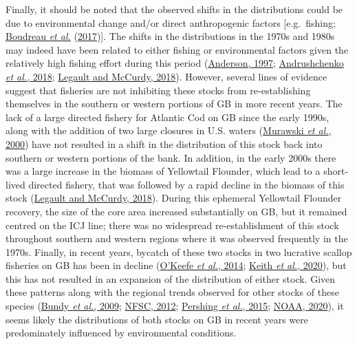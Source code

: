 \documentclass[
]{article}
\begin{document}
Finally, it should be noted that the observed shifts in the distributions could be due to environmental change and/or direct anthropogenic factors {[}e.g.~fishing; \protect\hyperlink{ref-boudreauConnectivityPersistenceLoss2017}{Boudreau \emph{et al.}} (\protect\hyperlink{ref-boudreauConnectivityPersistenceLoss2017}{2017}){]}. The shifts in the distributions in the 1970s and 1980s may indeed have been related to either fishing or environmental factors given the relatively high fishing effort during this period (\protect\hyperlink{ref-andersonHistoryFisheriesManagement1997}{Anderson, 1997}; \protect\hyperlink{ref-andrushchenkoAssessmentEasternGeorges2018}{Andrushchenko \emph{et al.}, 2018}; \protect\hyperlink{ref-legaultStockAssessmentGeorges2018}{Legault and McCurdy, 2018}). However, several lines of evidence suggest that fisheries are not inhibiting these stocks from re-establishing themselves in the southern or western portions of GB in more recent years. The lack of a large directed fishery for Atlantic Cod on GB since the early 1990s, along with the addition of two large closures in U.S. waters (\protect\hyperlink{ref-murawskiLargescaleClosedAreas2000}{Murawski \emph{et al.}, 2000}) have not resulted in a shift in the distribution of this stock back into southern or western portions of the bank. In addition, in the early 2000s there was a large increase in the biomass of Yellowtail Flounder, which lead to a short-lived directed fishery, that was followed by a rapid decline in the biomass of this stock (\protect\hyperlink{ref-legaultStockAssessmentGeorges2018}{Legault and McCurdy, 2018}). During this ephemeral Yellowtail Flounder recovery, the size of the core area increased substantially on GB, but it remained centred on the ICJ line; there was no widespread re-establishment of this stock throughout southern and western regions where it was observed frequently in the 1970s. Finally, in recent years, bycatch of these two stocks in two lucrative scallop fisheries on GB has been in decline (\protect\hyperlink{ref-okeefeEvaluatingEffectivenessTime2014}{O'Keefe \emph{et al.}, 2014}; \protect\hyperlink{ref-keithEvaluatingSocioeconomicConservation2020}{Keith \emph{et al.}, 2020}), but this has not resulted in an expansion of the distribution of either stock. Given these patterns along with the regional trends observed for other stocks of these species (\protect\hyperlink{ref-bundySealsCodForage2009}{Bundy \emph{et al.}, 2009}; \protect\hyperlink{ref-nfsc54thNortheastRegional2012}{NFSC, 2012}; \protect\hyperlink{ref-pershingSlowAdaptationFace2015}{Pershing \emph{et al.}, 2015}; \protect\hyperlink{ref-noaaNOAAYellowtailFlounder2020}{NOAA, 2020}), it seems likely the distributions of both stocks on GB in recent years were predominately influenced by environmental conditions.
\end{document}
